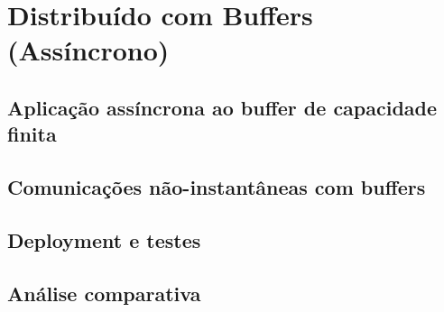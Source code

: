 \section{Distribuído com Buffers (Assíncrono)}

\subsection{Aplicação assíncrona ao buffer de capacidade finita}

\subsection{Comunicações não-instantâneas com buffers}

\subsection{Deployment e testes}

\subsection{Análise comparativa}

